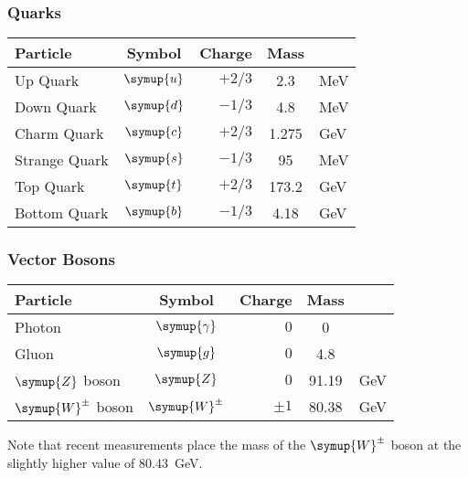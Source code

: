\documentclass[fleqn]{NotesClass}
\newcommand{\Pparticle}[1]{\symup{#1}}
\newcommand{\Pu}{\ensuremath{\Pparticle{u}}}
\newcommand{\Pd}{\ensuremath{\Pparticle{d}}}
\newcommand{\Ps}{\ensuremath{\Pparticle{s}}}
\newcommand{\Pc}{\ensuremath{\Pparticle{c}}}
\newcommand{\Pt}{\ensuremath{\Pparticle{t}}}
\newcommand{\Pb}{\ensuremath{\Pparticle{b}}}
\newcommand{\PZ}{\ensuremath{\Pparticle{Z}}}
\newcommand{\PWpm}{\ensuremath{\Pparticle{W}^{\pm}}}
\newcommand{\Pphoton}{\ensuremath{\Pparticle{\gamma}}}
\newcommand{\Pg}{\ensuremath{\Pparticle{g}}}
\begin{document}
\begin{appendices}
        \subsubsection{Quarks}
        \begin{center}
            \begin{tabular}{lcrSl}\toprule
                Particle & Symbol & Charge & Mass & \\ \hline
                Up Quark & \Pu & \(+2/3\) & 2.3 & \si{\mega\electronvolt} \\
                Down Quark & \Pd & \(-1/3\) & 4.8 & \si{\mega\electronvolt} \\
                Charm Quark & \Pc & \(+2/3\) & 1.275 & \si{\giga\electronvolt} \\
                Strange Quark & \Ps & \(-1/3\) & 95 & \si{\mega\electronvolt} \\
                Top Quark & \Pt & \(+2/3\) & 173.2 & \si{\giga\electronvolt} \\
                Bottom Quark & \Pb & \(-1/3\) & 4.18 & \si{\giga\electronvolt} \\
                \bottomrule
            \end{tabular}
        \end{center}
        
        \subsubsection{Vector Bosons}
        \begin{center}
            \begin{tabular}{lcrSl}\toprule
                Particle & Symbol & Charge & Mass & \\ \hline
                Photon & \Pphoton & \(0\) & 0 & \\
                Gluon & \Pg & \(0\) & 4.8 & \\
                \PZ{} boson & \PZ & \(0\) & 91.19 & \si{\giga\electronvolt} \\
                \PWpm{} boson & \PWpm & \(\pm 1\) & 80.38 & \si{\giga\electronvolt} \\
                \bottomrule
            \end{tabular}
        \end{center}
        Note that recent measurements place the mass of the \PWpm{} boson at the slightly higher value of \qty{80.43}{\giga\electronvolt}.
        

\end{appendices}
\end{document}
